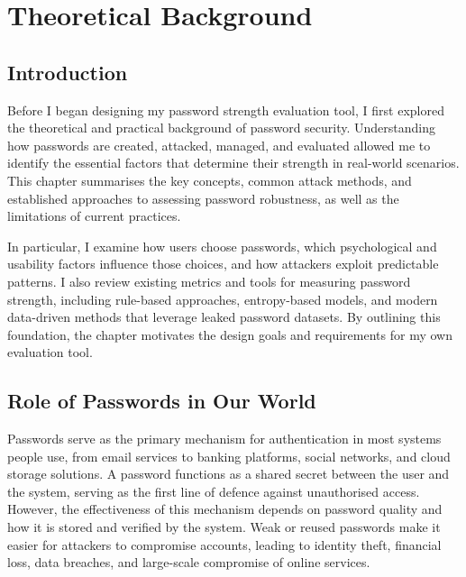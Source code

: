 
\clearpage

\chapter{Theoretical Background}

\section{Introduction}

Before I began designing my password strength evaluation tool, I first explored the theoretical and practical background of password security. Understanding how passwords are created, attacked, managed, and evaluated allowed me to identify the essential factors that determine their strength in real-world scenarios. This chapter summarises the key concepts, common attack methods, and established approaches to assessing password robustness, as well as the limitations of current practices.

In particular, I examine how users choose passwords, which psychological and usability factors influence those choices, and how attackers exploit predictable patterns. I also review existing metrics and tools for measuring password strength, including rule-based approaches, entropy-based models, and modern data-driven methods that leverage leaked password datasets. By outlining this foundation, the chapter motivates the design goals and requirements for my own evaluation tool.


\section{Role of Passwords in Our World}

Passwords serve as the primary mechanism for authentication in most systems people use, from email services to banking platforms, social networks, and cloud storage solutions. A password functions as a shared secret between the user and the system, serving as the first line of defence against unauthorised access. However, the effectiveness of this mechanism depends on password quality and how it is stored and verified by the system. Weak or reused passwords make it easier for attackers to compromise accounts, leading to identity theft, financial loss, data breaches, and large-scale compromise of online services.

